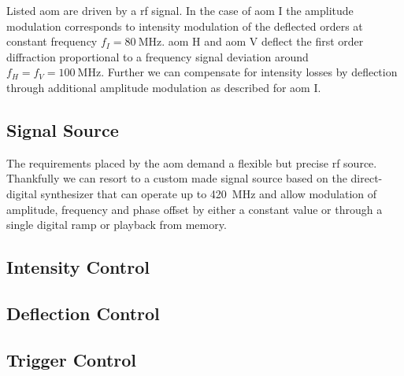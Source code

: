 Listed \gls{aom} are driven by a \gls{rf} signal. In the case of \gls{aom} I
the amplitude modulation corresponds to intensity modulation of the deflected
orders at constant frequency $f_I=\SI{80}{\mega\hertz}$. \gls{aom} H
and \gls{aom} V deflect the first order diffraction proportional to
a frequency signal deviation around $f_H=f_V=\SI{100}{\mega\hertz}$. Further
we can compensate for intensity losses by deflection through additional
amplitude modulation as described for \gls{aom} I.

\subsection{Signal Source}

The requirements placed by the \gls{aom} demand a flexible but precise
\gls{rf} source. Thankfully we can resort to a custom made signal source
based on the \cite{AD9910} direct-digital synthesizer that can operate up to
\SI{420}{\mega\hertz} and allow modulation of amplitude, frequency and phase
offset by either a constant value or through a single digital ramp or playback
from memory.

\subsection{Intensity Control}

\subsection{Deflection Control}

\subsection{Trigger Control}
